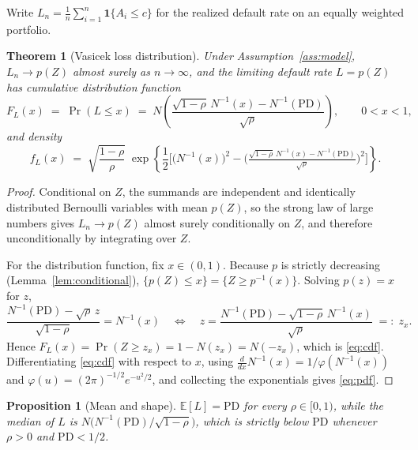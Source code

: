\documentclass[11pt]{article}
\newtheorem{theorem}{Theorem}
\newtheorem{proposition}{Proposition}
\theoremstyle{remark}
\theoremstyle{definition}
\begin{document}
Write $L_n = \frac{1}{n}\sum_{i=1}^n \mathbf{1}\{A_i \le c\}$ for the realized default rate on an equally weighted portfolio.

\begin{theorem}[Vasicek loss distribution]
\label{thm:vasicek}
Under Assumption~\ref{ass:model}, $L_n \to p(Z)$ almost surely as $n \to \infty$, and the limiting default rate $L = p(Z)$ has cumulative distribution function
\begin{equation}
\label{eq:cdf}
F_L(x) \;=\; \Pr(L \le x) \;=\; N\!\left(\frac{\sqrt{1-\rho}\,N^{-1}(x) - N^{-1}(\text{PD})}{\sqrt{\rho}}\right), \qquad 0 < x < 1,
\end{equation}
and density
\begin{equation}
\label{eq:pdf}
f_L(x) \;=\; \sqrt{\frac{1-\rho}{\rho}}\;
\exp\!\left\{\frac{1}{2}\Big[\big(N^{-1}(x)\big)^2 - \Big(\tfrac{\sqrt{1-\rho}\,N^{-1}(x)-N^{-1}(\text{PD})}{\sqrt{\rho}}\Big)^{2}\Big]\right\}.
\end{equation}
\end{theorem}

\begin{proof}
Conditional on $Z$, the summands are independent and identically distributed Bernoulli variables with mean $p(Z)$, so the strong law of large numbers gives $L_n \to p(Z)$ almost surely conditionally on $Z$, and therefore unconditionally by integrating over $Z$.

For the distribution function, fix $x \in (0,1)$. Because $p$ is strictly decreasing (Lemma~\ref{lem:conditional}), $\{p(Z) \le x\} = \{Z \ge p^{-1}(x)\}$. Solving $p(z)=x$ for $z$,
\begin{equation*}
\frac{N^{-1}(\text{PD}) - \sqrt{\rho}\,z}{\sqrt{1-\rho}} = N^{-1}(x)
\quad\Longleftrightarrow\quad
z = \frac{N^{-1}(\text{PD}) - \sqrt{1-\rho}\,N^{-1}(x)}{\sqrt{\rho}} \;=:\; z_x .
\end{equation*}
Hence $F_L(x) = \Pr(Z \ge z_x) = 1 - N(z_x) = N(-z_x)$, which is \eqref{eq:cdf}. Differentiating \eqref{eq:cdf} with respect to $x$, using $\frac{d}{dx}N^{-1}(x) = 1/\varphi(N^{-1}(x))$ and $\varphi(u)=(2\pi)^{-1/2}e^{-u^2/2}$, and collecting the exponentials gives \eqref{eq:pdf}.
\end{proof}

\begin{proposition}[Mean and shape]
\label{prop:mean}
$\mathbb{E}[L] = \text{PD}$ for every $\rho \in [0,1)$, while the median of $L$ is $N\big(N^{-1}(\text{PD})/\sqrt{1-\rho}\big)$, which is strictly below $\text{PD}$ whenever $\rho > 0$ and $\text{PD} < 1/2$.
\end{proposition}
\end{document}

